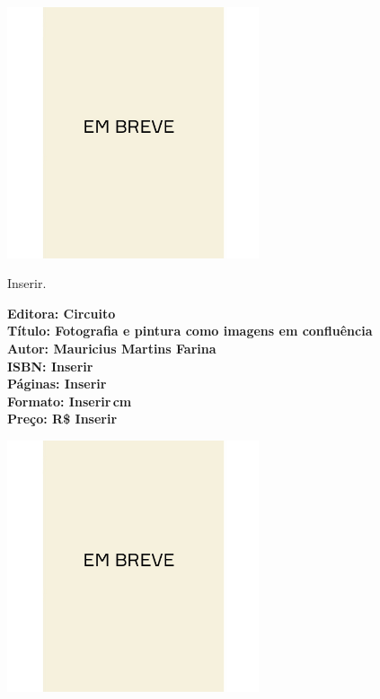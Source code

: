 \begin{center}
\hspace*{-3.6cm}
\hspace*{3.1cm}\includegraphics[width=74mm]{./CAPAS/breve.jpeg}
\end{center}
\hspace*{-7cm}\hrulefill\hspace*{-7cm}
\medskip

\noindent{}Inserir.

\vfill
\noindent\begin{minipage}[c]{1\linewidth}
{\small\textbf{
\hspace*{-.1cm}Editora: Circuito\\
Título: Fotografia e pintura como imagens em confluência\\
Autor: Mauricius Martins Farina\\ 
ISBN: Inserir\\
Páginas: Inserir\\
Formato: Inserir\,cm\\
Preço: R\$ Inserir\\
}}
\end{minipage}
\pagebreak

\begin{center}
\hspace*{.5cm}\includegraphics[width=74mm]{./CAPAS/breve.jpeg}
\end{center}
\hspace*{-7cm}\hrulefill\hspace*{-7cm}
\medskip

